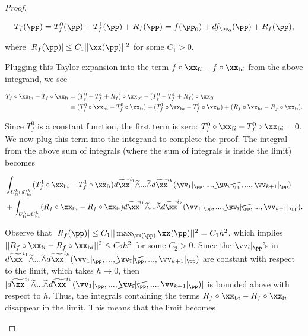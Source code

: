 \begin{proof}
\begin{enumerate}
        \begin{align*}
            T_f(\pp) = T^0_f(\pp) + T^1_f(\pp) + R_f(\pp) = f(\pp_0) + df_{\pp_0}(\pp) + R_f(\pp),
        \end{align*}
        
        where $|R_f(\pp)| \leq C_1||\xx(\pp)||^2$ for some $C_1 > 0$.
        
        Plugging this Taylor expansion into the term $f \circ \xfi - f \circ \xbi$ from the above integrand, we see 
        
        \begin{align*}
            T_f \circ \xbi - T_f \circ \xfi &= (T^0_f - T^1_f + R_f) \circ \xbi - (T^0_f - T^1_f + R_f) \circ \xfi \\
            &= (T^0_f \circ \xbi - T^0_f \circ \xfi) + (T^1_f \circ \xbi - T^1_f \circ \xfi) + (R_f \circ \xbi - R_f \circ \xfi).
        \end{align*}
        
        Since $T^0_f$ is a constant function, the first term is zero: $T^0_f \circ \xfi - T^0_f \circ \xbi = 0$. We now plug this term into the integrand to complete the proof. The integral from the above sum of integrals (where the sum of integrals is inside the limit) becomes
        
        \begin{align*}
            &\int_{\Ufi \sqcup \Ubi} (T^1_f \circ \xbi - T^1_f \circ \xfi) d\tx^{i_1} \twedge ... \twedge d\tx^{i_k}(\vv_1|_\pp, ..., \cancel{\vv_i|_\pp}, ..., \vv_{k + 1}|_\pp) \\
            &+ \int_{\Ufi \sqcup \Ubi} (R_f \circ \xbi - R_f \circ \xfi) d\tx^{i_1} \twedge ... \twedge d\tx^{i_k}(\vv_1|_\pp, ..., \cancel{\vv_i|_\pp}, ..., \vv_{k + 1}|_\pp).
        \end{align*}
        
        Observe that $|R_f(\pp)| \leq C_1||\max_{\xx(\pp)} \xx(\pp)||^2 = C_1h^2$, which implies $||R_f \circ \xfi - R_f \circ \xbi||^2 \leq C_2h^2$ for some $C_2 > 0$. Since the $\vv_i|_\pp$'s in $d\tx^{i_1} \twedge ... \twedge d\tx^{i_k}(\vv_1|_\pp, ..., \cancel{\vv_i|_\pp}, ..., \vv_{k + 1}|_\pp)$ are constant with respect to the limit, which takes $h \rightarrow 0$, then $|d\tx^{i_1} \twedge ... \twedge d\tx^{i_k}(\vv_1|_\pp, ..., \cancel{\vv_i|_\pp}, ..., \vv_{k + 1}|_\pp)|$ is bounded above with respect to $h$. Thus, the integrals containing the terms $R_f \circ \xbi - R_f \circ \xfi$ disappear in the limit. This means that the limit becomes
        

\end{enumerate}
\end{proof}
